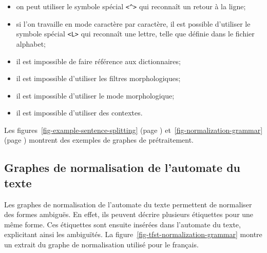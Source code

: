 \begin{itemize}
  \item on peut utiliser le symbole spécial \verb+<^>+ qui reconnaît un retour à la
  	  ligne;\index{\verb+<^>+}
  \item si l'on travaille en mode caractère par caractère, il est possible d'utiliser 
  	  le symbole spécial \verb+<L>+ qui reconnaît une lettre, telle que définie dans le fichier
  	  alphabet;
  \item il est impossible de faire référence aux dictionnaires;
  \item il est impossible d’utiliser les filtres morphologiques;
  \item il est impossible d’utiliser le mode morphologique;
  \item il est impossible d’utiliser des contextes.
\end{itemize}

Les figures~\ref{fig-example-sentence-splitting} (page \pageref{fig-example-sentence-splitting})
et~\ref{fig-normalization-grammar} (page \pageref{fig-normalization-grammar}) montrent des exemples
de graphes de prétraitement.


\subsection{Graphes de normalisation de l’automate du texte}
\label{section-normalizing-text-automataon}
Les graphes de normalisation de l’automate du texte permettent de normaliser des formes
ambiguës. En effet, ils peuvent décrire plusieurs étiquettes pour une même forme. Ces étiquettes
sont ensuite insérées dans l’automate du texte, explicitant ainsi les ambiguïtés. La
figure~\ref{fig-tfst-normalization-grammar} montre un extrait du graphe de normalisation utilisé
pour le français.

